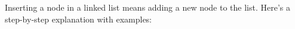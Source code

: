 \documentclass[preview]{standalone}
\begin{document}
Inserting a node in a linked list means adding a new node to the list. Here's a step-by-step explanation with examples:\\
\end{document}
